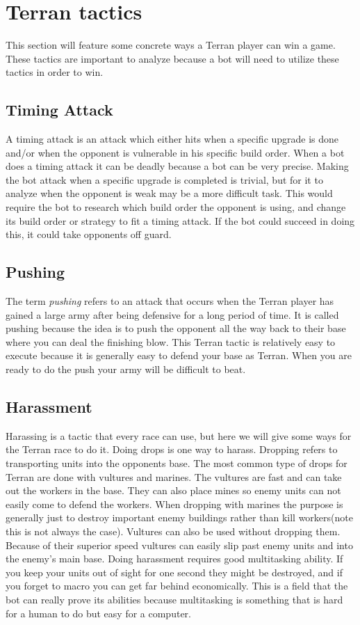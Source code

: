 \section{Terran tactics}
	This section will feature some concrete ways a Terran player can win a game. 
	These tactics are important to analyze because a bot will need to utilize these tactics in order to win.
	
	\subsection{Timing Attack}
		A timing attack is an attack which either hits when a specific upgrade is done and/or when the opponent is vulnerable in his specific build order. 
		When a bot does a timing attack it can be deadly because a bot can be very precise. Making the bot attack when a specific upgrade is completed is trivial, but for it to 
		analyze when the opponent is weak may be a more difficult task. This would require the bot to research which build order the opponent is using, and 
		 change its build order or strategy to fit a timing attack. If the bot could succeed in doing this, it could take opponents off guard.
		
	\subsection{Pushing}
		The term \textit{pushing} refers to an attack that occurs when the Terran player has gained a large army after being defensive for a long 
		period of time. It is called pushing because the idea is to push the opponent 
		all the way back to their base where you can deal the finishing blow. This Terran tactic is relatively easy to execute because it is generally
		easy to defend your base as Terran. When you are ready to do the push your army will be difficult to beat.
		
	\subsection{Harassment}
		Harassing is a tactic that every race can use, but here we will give some ways for the Terran race to do it. Doing drops is one way to harass. Dropping 
		refers to transporting units into the opponents base. The most common type of drops for Terran are done with vultures and marines. The vultures are 
		fast and can take out the workers in the base. They can also place mines so enemy units can not easily come to defend the workers. When dropping with marines 
		the purpose is generally just to destroy important enemy buildings rather than kill workers(note this is not always the case). Vultures can also be used without 
		dropping them. Because of their superior speed vultures can easily slip past enemy units and into the enemy's main base. Doing harassment requires 
		good multitasking ability. If you keep your units out of sight for one second they might be destroyed, and if you forget to macro you can 
		get far behind economically. This is a field that the bot can really prove its abilities because multitasking is something that is hard for a human to do but 
		easy for a computer.
	
